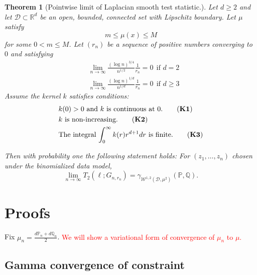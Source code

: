 \documentclass{article}
\newcommand{\Reals}{\mathbb{R}}
\newcommand{\Rd}{\Reals^d}
\newcommand{\lbf}{\bm{\ell}}
\newcommand{\Dset}{\mathcal{D}}
\newcommand{\Wset}{\mathcal{W}}
\newcommand{\Pbb}{\mathbb{P}}
\newcommand{\Qbb}{\mathbb{Q}}
\newcommand{\1}{\mathbf{1}}
\theoremstyle{alden}
\theoremstyle{aldenthm}
\newtheorem{theorem}{Theorem}
\theoremstyle{remark}
\begin{document}
\begin{theorem}[Pointwise limit of Laplacian smooth test statistic.]
	\label{thm: LLN_for_t2}
	Let $d \geq 2$ and let $\Dset \subset \Rd$ be an open, bounded, connected set with Lipschitz boundary. Let $\mu$ satisfy
	\begin{equation*}
	m \leq \mu(x) \leq M \tag{$\forall x \in D$}
	\end{equation*}
	for some $0 < m \leq M$. Let $(r_n)$ be a sequence of positive numbers converging to $0$ and satisfying
	\begin{align*}
	& \lim_{n \to \infty} \frac{(\log n)^{3/4}}{n^{1/2}} \frac{1}{r_n} = 0 ~~ \text{if $d = 2$} \\
	& \lim_{n \to \infty} \frac{(\log n)^{1/d}}{n^{1/d}} \frac{1}{r_n} = 0 ~~ \text{if $d \geq 3$}
	\end{align*}
	Assume the kernel $k$ satisfies conditions: 
	\begin{align*}
	& k(0) > 0 ~ \text{and $k$ is continuous at $0$.} \tag{\textbf{K1}} \\
	& k~ \text{is non-increasing.} \tag{\textbf{K2}} \\
	& \text{The integral $\int_{0}^{\infty} k(r) r^{d+1} dr$ is finite.} \tag{\textbf{K3}}
	\end{align*}
	
	Then with probability one the following statement holds: For $(z_1, \ldots, z_n)$ chosen under the binomialized data model,
	\begin{equation*}
	\lim_{n \to \infty} T_2(\lbf; G_{n,r_n}) = \gamma_{\Wset^{1,2}(\Dset,\mu^2)}(\Pbb,\Qbb).
	\end{equation*}
\end{theorem}

\section{Proofs}

Fix $\mu_n = \frac{d\Pbb_n + d\Qbb_n}{2}$. \textcolor{red}{We will show a variational form of convergence of $\mu_n$ to $\mu$.}

\subsection{Gamma convergence of constraint}
\end{document}
